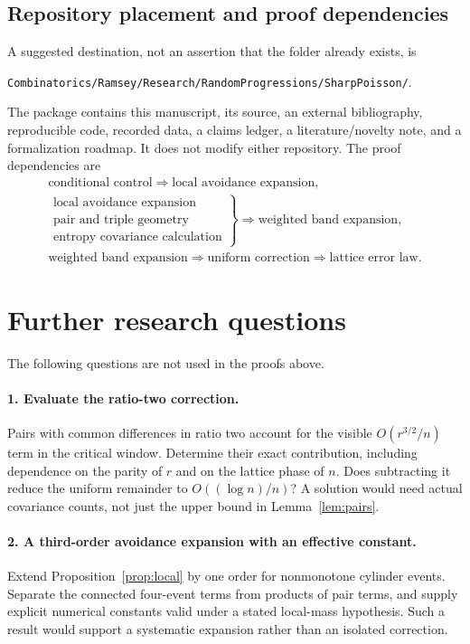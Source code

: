\documentclass[11pt]{article}
\theoremstyle{definition}\newtheorem{definition}[theorem]{Definition}
\theoremstyle{remark}\newtheorem{remark}[theorem]{Remark}
\begin{document}
\subsection{Repository placement and proof dependencies}
A suggested destination, not an assertion that the folder already exists,
is
\begin{center}
\texttt{Combinatorics/Ramsey/Research/RandomProgressions/SharpPoisson/}.
\end{center}
The package contains this manuscript, its source, an external bibliography,
reproducible code, recorded data, a claims ledger, a literature/novelty
note, and a formalization roadmap. It does not modify either repository.
The proof dependencies are
\[
 \begin{gathered}
 \text{conditional control}\Longrightarrow\text{local avoidance expansion},\\[4pt]
 \left.\begin{matrix}
  \text{local avoidance expansion}\\
  \text{pair and triple geometry}\\
  \text{entropy covariance calculation}
 \end{matrix}\right\}
 \Longrightarrow\text{weighted band expansion},\\[4pt]
 \text{weighted band expansion}
 \Longrightarrow\text{uniform correction}
 \Longrightarrow\text{lattice error law}.
 \end{gathered}
\]

\section{Further research questions}\label{sec:questions}
The following questions are not used in the proofs above.

\paragraph{1. Evaluate the ratio-two correction.}
Pairs with common differences in ratio two account for the visible
$O(r^{3/2}/n)$ term in the critical window. Determine their exact
contribution, including dependence on the parity of $r$ and on the
lattice phase of $n$. Does subtracting it reduce the uniform remainder
to $O((\log n)/n)$? A solution would need actual covariance counts,
not just the upper bound in Lemma~\ref{lem:pairs}.

\paragraph{2. A third-order avoidance expansion with an effective constant.}
Extend Proposition~\ref{prop:local} by one order for nonmonotone cylinder
events. Separate the connected four-event terms from products of pair
terms, and supply explicit numerical constants valid under a stated
local-mass hypothesis. Such a result would support a systematic
expansion rather than an isolated correction.
\end{document}
